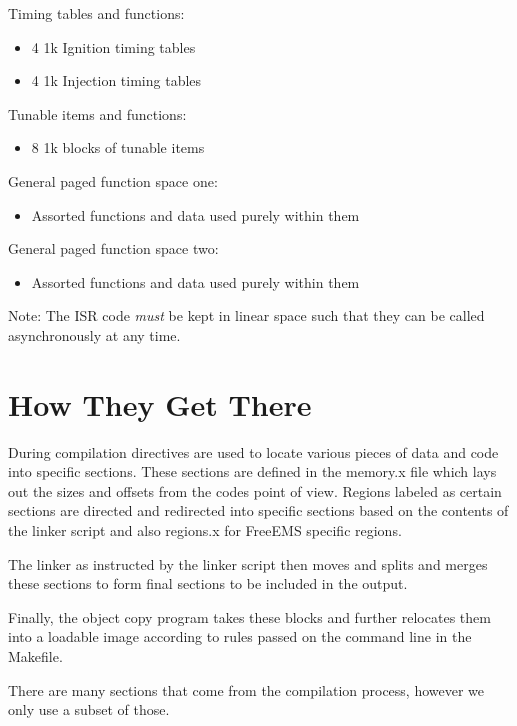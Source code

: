 \documentclass[12pt,a4paper,titlepage]{article}
\begin{document}
\begin{titlepage}
\begin{center}
Timing tables and functions:

\begin{itemize}
\item 4 1k Ignition timing tables
\item 4 1k Injection timing tables
\end{itemize}


Tunable items and functions:

\begin{itemize}
\item 8 1k blocks of tunable items
\end{itemize}


General paged function space one:

\begin{itemize}
\item Assorted functions and data used purely within them
\end{itemize}


General paged function space two:

\begin{itemize}
\item Assorted functions and data used purely within them
\end{itemize}


Note: The ISR code \emph{must} be kept in linear space such that they can be
called asynchronously at any time.




\section{How They Get There}

During compilation directives are used to locate various pieces of data and code into specific sections. These sections are defined in the memory.x file which lays out the sizes and offsets from the codes point of view. Regions labeled as certain sections are directed and redirected into specific sections based on the contents of the linker script and also regions.x for FreeEMS specific regions.

The linker as instructed by the linker script then moves and splits and merges these sections to form final sections to be included in the output.

Finally, the object copy program takes these blocks and further relocates them into a loadable image according to rules passed on the command line in the Makefile.

There are many sections that come from the compilation process, however we only use a subset of those.


\end{center}
\end{titlepage}
\end{document}

